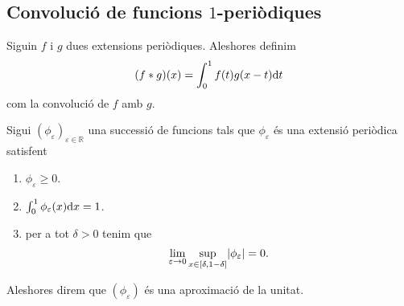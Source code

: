 \documentclass[../Apunts.tex]{subfiles}
\begin{document}
	\subsection{Convolució de funcions \ensuremath{1}-periòdiques}
	\begin{definition}
		\label{def:convolució de dues extensions periòdiques}
		Siguin \(f\) i \(g\) dues extensions periòdiques. Aleshores definim
		\[(f\ast g)(x)=\int_{0}^{1}f(t)g(x-t)\mathrm{d} t\]
		com la convolució de \(f\) amb \(g\).
	\end{definition}
	\begin{definition}
		\label{def:aproximació de la unitat en extensions periòdiques}
		Sigui \((\phi_{\varepsilon})_{\varepsilon\in\mathbb{R}}\) una successió de funcions tals que \(\phi_{\varepsilon}\) és una extensió periòdica satisfent
		\begin{enumerate}
			\item \(\phi_{\varepsilon}\geq0\).
			\item \(\int_{0}^{1}\phi_{\varepsilon}(x)\mathrm{d} x=1\).
			\item per a tot \(\delta>0\) tenim que
			\[\lim_{\varepsilon\to0}\sup_{x\in[\delta,1-\delta]}\abs{\phi_{\varepsilon}}=0.\]
		\end{enumerate}
		Aleshores direm que \((\phi_{\varepsilon})\) és una aproximació de la unitat.
	\end{definition}
\end{document}
